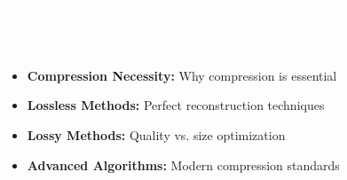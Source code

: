 \documentclass[aspectratio=1610,8pt]{beamer}
\begin{document}
\begin{frame}
\begin{center}
\vspace{1.5cm}
\begin{tcolorbox}[colback=navyblue,colframe=navyblue,width=0.9\textwidth,center,boxrule=2pt]
\centering
\textcolor{white}{\Huge \textbf{COMPRESSION}}\\[0.5cm]
\textcolor{white}{\LARGE \textbf{Fundamentals \& Techniques}}\\[0.3cm]
\textcolor{white}{\large Optimizing Storage and Transmission}
\end{tcolorbox}
\vspace{1cm}
\begin{itemize}
    \item \textbf{Compression Necessity:} Why compression is essential
    \item \textbf{Lossless Methods:} Perfect reconstruction techniques
    \item \textbf{Lossy Methods:} Quality vs. size optimization
    \item \textbf{Advanced Algorithms:} Modern compression standards
\end{itemize}
\end{center}
\end{frame}
\end{document}
